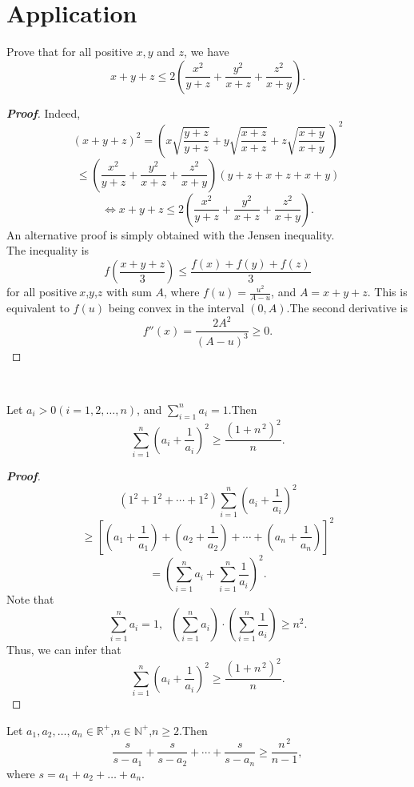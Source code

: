 \documentclass{memoir}
\begin{document}
\section{Application}
\begin{example}
	
	Prove that for all positive $x,y$ and $z$, we have
	\[x+y+z\leqslant 2\left(\frac{x^2}{y+z}+\frac{y^2}{x+z}+\frac{z^2}{x+y}\right).
	\]
\end{example}	

\begin{proof}[\textbf{Proof}]
Indeed,	\[(x+y+z)^2=\left(x\sqrt{\frac{y+z}{y+z}}+y\sqrt{\frac{x+z}{x+z}}+z\sqrt{\frac{x+y}{x+y}}\;\right)^2\]
\[\leqslant \left(\frac{x^2}{y+z}+\frac{y^2}{x+z}+\frac{z^2}{x+y}\right)(y+z+x+z+x+y)
	\]
\[\iff x+y+z\leqslant 2\left(\frac{x^2}{y+z}+\frac{y^2}{x+z}+\frac{z^2}{x+y}\right).\]
	An alternative proof is simply obtained with the Jensen inequality.\\
	The inequality is
	\[f\left(\frac{x+y+z}{3}\right)\leqslant\frac{f(x)+f(y)+f(z)}{3}
	\]
	for all positive$\ x$,$y$,$z$ with sum $A$, where $\displaystyle f(u)=\frac{u^2}{A-u}$, and $A=x+y+z$.
	This is equivalent to $f(u)$ being convex in the interval $(0,A)$.The second derivative is\[f''(x) =\frac{2A^2}{(A-u)^3}\geqslant 0 . \]
	\end{proof}
\par \ 

\begin{example}
Let $a_i>0 (i=1,2,\dots,n)$,  and $\sum\limits_{i=1}^n a_i=1$.Then\[\sum \limits^{n}_{i=1}\left(a_{i}+\frac{1}{a_{i}}
\right)^{2}\geqslant\frac{(1+n^{\,2})^{2}}{n} .\]
\end{example}

\begin{proof}[\textbf{Proof}]
\[(1^{2}+1^{2}+ \cdots+1^{2})\sum \limits^{n}_{i=1}\left( a_{i}+\frac{1}{a_{i}} \right) ^{2}\]
\[\geqslant\left[ \left( a_{1}+\frac{1}{a_{1}}  \right) +\left( a_{2}+\frac{1}{a_{2}} \right)+\cdots+ \left( a_{n}+\frac{1}{a_{n}} \right)\right]^2 \]
\[=\left(\sum^n_{i=1}a_i+\sum_{i=1}^n\frac{1}{a_i}\right)^2.\]
Note that\[\sum^n_{i=1}a_i=1,  \;\; \left(\sum^n_{i=1}a_i\right)\cdot\left(\sum_{i=1}^n\frac{1}{a_i}\right)\geqslant n^{2}.\]
Thus, we can infer that
\[\sum \limits^{n}_{i=1}\left(a_{i}+\frac{1}{a_{i}}
\right)^{2}\geqslant\frac{(1+n^{\,2})^{2}}{n} .\]
\end{proof}
\par \quad

\begin{example}
Let $a_1, a_2, \dots,a_n\in\mathbb{R}^+$,$n\in\mathbb{N}^+$,$n\geqslant2$.Then \[\frac{s}{s-a_{1}} +\frac{s}{s-a_{2}} +\cdots +\frac{s}{s-a_{n}}\geqslant \frac{n^{\,2}}{n-1} ,\]where $s=a_1+a_2+\dots+a_n$.
\end{example}
\end{document}
